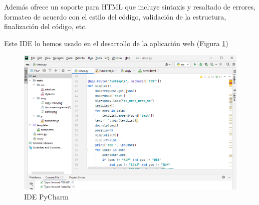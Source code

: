 Además ofrece un soporte para HTML que incluye sintaxis y resaltado de errores, formateo de acuerdo con el estilo del código, validación de la estructura, finalización del código, etc.

Este IDE lo hemos usado en el desarrollo de la aplicación web (Figura \ref{fig:pycharm})
	\begin{figure}[h!]
	\centering
	
	
	\includegraphics[scale=0.58]{Imagenes/Figuras/pycharm}
	
	
	\caption{IDE PyCharm}
	\label{fig:pycharm}
\end{figure}